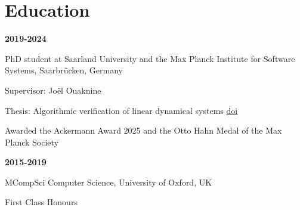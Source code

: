 \documentclass{article}
\begin{document}
	\section*{Education}
	\begin{minipage}{0.3\textwidth}
		\hspace{0.5cm} \textbf{2019-2024}
	\end{minipage}
	\vspace*{0.25cm}
	\begin{minipage}{0.7\textwidth}
		PhD student at Saarland University and the Max Planck Institute for Software Systems, Saarbrücken, Germany
		
		\vspace*{0.2cm}
		Supervisor: Jo\"el Ouaknine 
		
		\vspace*{0.2cm}
		Thesis: Algorithmic verification of linear dynamical systems \href{https://doi.org/doi:10.22028/D291-41630}{doi}
		
		\vspace*{0.2cm}
		Awarded the Ackermann Award 2025 and the Otto Hahn Medal of the Max Planck Society
		\vspace{0.3cm}
	\end{minipage}
	\vspace{0.85cm}
	\begin{minipage}{0.3\textwidth}
		\hspace{0.5cm} \textbf{2015-2019}
	\end{minipage}
	\begin{minipage}{0.7\textwidth}
		MCompSci Computer Science, University of Oxford, UK
		
		\vspace*{0.2cm}
		First Class Honours
	\end{minipage}
	
\end{document}
